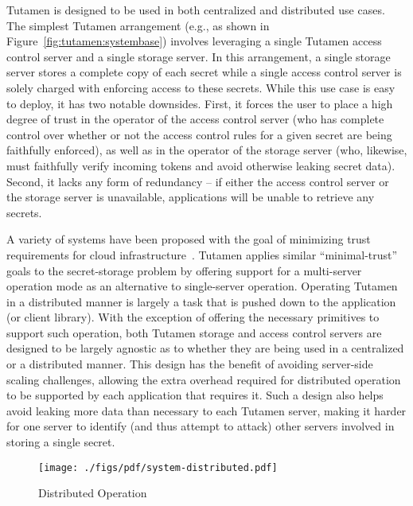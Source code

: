 Tutamen is designed to be used in both centralized and distributed use
cases. The simplest Tutamen arrangement (e.g., as shown in
Figure~\ref{fig:tutamen:systembase}) involves leveraging a single
Tutamen access control server and a single storage server. In this
arrangement, a single storage server stores a complete copy of each
secret while a single access control server is solely charged with
enforcing access to these secrets. While this use case is easy to
deploy, it has two notable downsides. First, it forces the user to
place a high degree of trust in the operator of the access control
server (who has complete control over whether or not the access
control rules for a given secret are being faithfully enforced), as
well as in the operator of the storage server (who, likewise, must
faithfully verify incoming tokens and avoid otherwise leaking secret
data). Second, it lacks any form of redundancy -- if either the access
control server or the storage server is unavailable, applications will
be unable to retrieve any secrets.

A variety of systems have been proposed with the goal of minimizing
trust requirements for cloud infrastructure~\cite{bessani2011,
  kallahalla2003, kubiatowicz2000, mahajan2011,
  wilcox-o'hearn2008}. Tutamen applies similar ``minimal-trust'' goals
to the secret-storage problem by offering support for a multi-server
operation mode as an alternative to single-server operation. Operating
Tutamen in a distributed manner is largely a task that is pushed down
to the application (or client library). With the exception of offering
the necessary primitives to support such operation, both Tutamen
storage and access control servers are designed to be largely agnostic
as to whether they are being used in a centralized or a distributed
manner. This design has the benefit of avoiding server-side scaling
challenges, allowing the extra overhead required for distributed
operation to be supported by each application that requires it. Such a
design also helps avoid leaking more data than necessary to each
Tutamen server, making it harder for one server to identify (and thus
attempt to attack) other servers involved in storing a single secret.

\begin{figure}[th]
  \centering
  \texttt{[image: ./figs/pdf/system-distributed.pdf]}
  \caption{Distributed Operation}
  \label{fig:tutamen:systemdistributed}
\end{figure}

